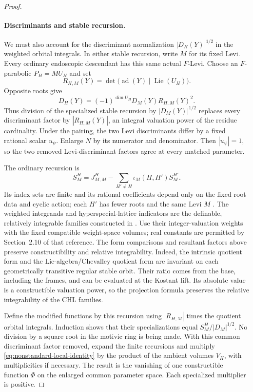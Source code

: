 \begin{proof}
\paragraph{Discriminants and stable recursion.}
We must also account for the discriminant normalization
$|D_H(Y)|^{1/2}$ in the weighted orbital integrals.
In either stable recursion, write $M$ for its fixed Levi.
Every ordinary endoscopic descendant has this same actual $F$-Levi.
Choose an $F$-parabolic $P_H=MU_H$ and set
\[
 R_{H,M}(Y)=\det\bigl(\operatorname{ad}(Y)
                     \mid\operatorname{Lie}(U_H)\bigr).
\]
Opposite roots give
\[
 D_H(Y)=(-1)^{\dim U_H}D_M(Y)R_{H,M}(Y)^2.
\]
Thus division of the specialized stable recursion by
$|D_M(Y)|^{1/2}$ replaces every discriminant factor by
$|R_{H,M}(Y)|$, an integral valuation power of the residue
cardinality.  Under the pairing, the two Levi discriminants differ
by a fixed rational scalar $u_\psi$.  Enlarge $N$ by its numerator
and denominator.  Then $|u_\psi|=1$, so the two removed
Levi-discriminant factors agree at every matched parameter.

The ordinary recursion is
\[
 S_M^H=J_{M,M}^H-
   \sum_{H'\ne H}\iota_M(H,H')S_M^{H'}.
\]
Its index sets are finite and its rational coefficients depend
only on the fixed root data and cyclic action; each $H'$ has fewer
roots and the same Levi $M$
\citep[Section~9.1]{CluckersHalesLoeser2011}.
The weighted integrands and hyperspecial-lattice indicators are
the definable, relatively integrable families constructed in
\citet[Sections~6 and~8.6]{CluckersHalesLoeser2011}.
Use their integer-valuation weights with the fixed compatible
weight-space volumes; real constants are permitted by Section~2.10
of that reference.  The form comparisons and resultant factors
above preserve constructibility and relative integrability.
Indeed, the intrinsic quotient form and the Lie-algebra/Chevalley
quotient form are invariant on each geometrically transitive
regular stable orbit.  Their ratio comes from the base, including
the frames, and can be evaluated at the Kostant lift.  Its absolute
value is a constructible valuation power, so the projection formula
preserves the relative integrability of the CHL families.

Define the modified functions by this recursion using
$|R_{H,M}|$ times the quotient orbital integrals.  Induction shows
that their specializations equal $S_M^H/|D_M|^{1/2}$.
No division by a square root in the motivic ring is being made.
With this common discriminant factor removed, expand the finite
recursions and multiply \eqref{eq:nonstandard-local-identity} by the
product of the ambient volumes $V_H$, with multiplicities if necessary.
The result is the vanishing of one
constructible function $\Phi$ on the enlarged common parameter
space.  Each specialized multiplier is positive.


\end{proof}
